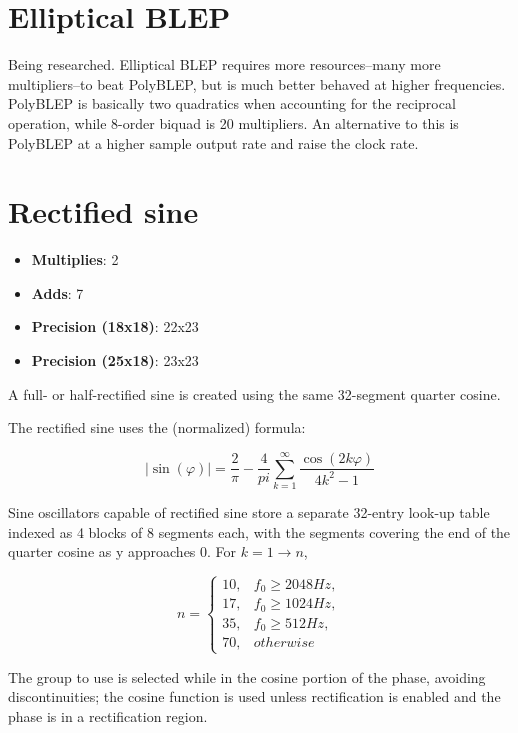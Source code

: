 \section{Elliptical BLEP}

Being researched.  Elliptical BLEP requires more resources--many more multipliers--to beat PolyBLEP, but is much better behaved at higher frequencies.  PolyBLEP is basically two quadratics when accounting for the reciprocal operation, while 8-order biquad is 20 multipliers.  An alternative to this is PolyBLEP at a higher sample output rate and raise the clock rate.

\section{Rectified sine}

\begin{itemize}
	\item \textbf{Multiplies}:  2
	\item \textbf{Adds}: 7
	\item \textbf{Precision (18x18)}:  22x23
	\item \textbf{Precision (25x18)}:  23x23
\end{itemize}

A full- or half-rectified sine is created using the same 32-segment quarter cosine.  

The rectified sine uses the (normalized) formula:

\begin{equation*}
	\left|\sin\left(\varphi\right)\right|=\frac{2}{\pi}-\frac{4}{pi}\sum_{k=1}^{\infty}{\frac{\cos\left(2k\varphi\right)}{4k^2-1}}
\end{equation*}

Sine oscillators capable of rectified sine store a separate 32-entry look-up table indexed as 4 blocks of 8 segments each, with the segments covering the end of the quarter cosine as y approaches 0.  For $k=1\rightarrow n$,

\begin{equation*}
	n=
	\begin{cases}
		10,& f_0 \geq 2048Hz, \\
		17,& f_0 \geq 1024Hz, \\
		35,& f_0 \geq 512Hz, \\
		70,& otherwise
	\end{cases}
\end{equation*}

The group to use is selected while in the cosine portion of the phase, avoiding discontinuities; the cosine function is used unless rectification is enabled and the phase is in a rectification region.

